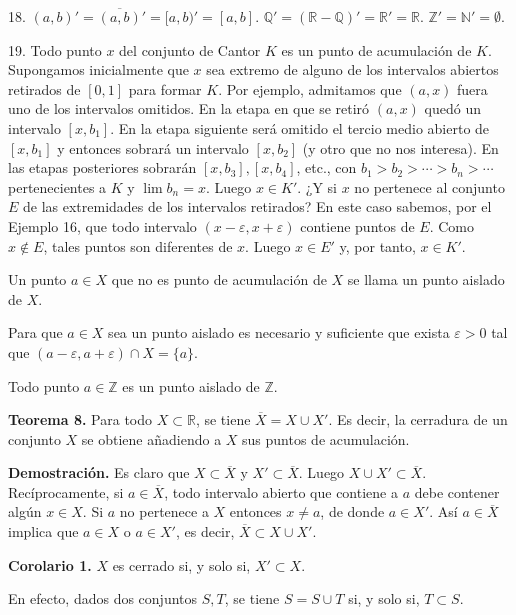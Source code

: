\documentclass[12pt,oneside]{book}
\begin{document}
18. \((a, b)' = \overline{(a, b)}' = [a, b)' = [a, b]\). \(\mathbb{Q}' = (\mathbb{R} - \mathbb{Q})' = \mathbb{R}' = \mathbb{R}\). \(\mathbb{Z}' = \mathbb{N}' = \emptyset\).

19. Todo punto \(x\) del conjunto de Cantor \(K\) es un punto de acumulación de \(K\). Supongamos inicialmente que \(x\) sea extremo de alguno de los intervalos abiertos retirados de \([0, 1]\) para formar \(K\). Por ejemplo, admitamos que \((a, x)\) fuera uno de los intervalos omitidos. En la etapa en que se retiró \((a, x)\) quedó un intervalo \([x, b_1]\). En la etapa siguiente será omitido el tercio medio abierto de \([x, b_1]\) y entonces sobrará un intervalo \([x, b_2]\) (y otro que no nos interesa). En las etapas posteriores sobrarán \([x, b_3], [x, b_4]\), etc., con \(b_1 > b_2 > \cdots > b_n > \cdots\) pertenecientes a \(K\) y \(\lim b_n = x\). Luego \(x \in K'\). ¿Y si \(x\) no pertenece al conjunto \(E\) de las extremidades de los intervalos retirados? En este caso sabemos, por el Ejemplo 16, que todo intervalo \((x - \varepsilon, x + \varepsilon)\) contiene puntos de \(E\). Como \(x \notin E\), tales puntos son diferentes de \(x\). Luego \(x \in E'\) y, por tanto, \(x \in K'\).

Un punto \(a \in X\) que no es punto de acumulación de \(X\) se llama un punto aislado de \(X\).

Para que \(a \in X\) sea un punto aislado es necesario y suficiente que exista \(\varepsilon > 0\) tal que \((a - \varepsilon, a + \varepsilon) \cap X = \{a\}\).

Todo punto \(a \in \mathbb{Z}\) es un punto aislado de \(\mathbb{Z}\).

\textbf{Teorema 8.} Para todo \(X \subset \mathbb{R}\), se tiene \(\overline{X} = X \cup X'\). Es decir, la cerradura de un conjunto \(X\) se obtiene añadiendo a \(X\) sus puntos de acumulación.

\textbf{Demostración.} Es claro que \(X \subset \overline{X}\) y \(X' \subset \overline{X}\). Luego \(X \cup X' \subset \overline{X}\). Recíprocamente, si \(a \in \overline{X}\), todo intervalo abierto que contiene a \(a\) debe contener algún \(x \in X\). Si \(a\) no pertenece a \(X\) entonces \(x \neq a\), de donde \(a \in X'\). Así \(a \in \overline{X}\) implica que \(a \in X\) o \(a \in X'\), es decir, \(\overline{X} \subset X \cup X'\).

\textbf{Corolario 1.} \(X\) es cerrado si, y solo si, \(X' \subset X\).

En efecto, dados dos conjuntos \(S, T\), se tiene \(S = S \cup T\) si, y solo si, \(T \subset S\).
\end{document}
